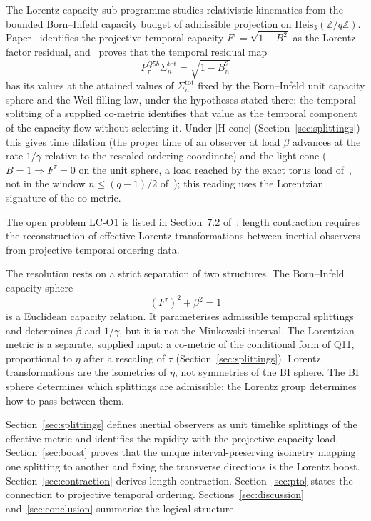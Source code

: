 \documentclass[12pt,a4paper]{article}
\theoremstyle{remark}
\theoremstyle{definition}
\begin{document}
    The Lorentz-capacity sub-programme studies relativistic kinematics from the bounded
    Born--Infeld capacity budget of admissible projection on
    $\mathrm{Heis}_3(\mathbb{Z}/q\mathbb{Z})$.
    Paper~\cite{Beau2026n} identifies the projective temporal capacity $F^\tau = \sqrt{1-B^2}$
    as the Lorentz factor residual, and~\cite{Beau2026tp} proves that the temporal residual map
    \[
      P^{Q5b}_\tau \Sigma^{\mathrm{tot}}_n = \sqrt{1-B_n^2}
    \]
    has its values at the attained values of $\Sigma^{\mathrm{tot}}_n$ fixed by the Born--Infeld unit capacity
    sphere and the Weil filling law, under the hypotheses stated there; the temporal splitting of a supplied
    co-metric identifies that value as the temporal component of the capacity flow without selecting it.
    Under [H-cone] (Section~\ref{sec:splittings}) this gives time dilation (the proper time of an observer at load
    $\beta$ advances at the rate $1/\gamma$ relative to the rescaled ordering coordinate) and the light
    cone ($B = 1 \Rightarrow F^\tau = 0$ on the unit sphere, a load reached by the exact torus load
    of~\cite{Beau2026lco3}, not in the window $n \le (q-1)/2$ of~\cite{Beau2026tp}); this reading uses the
    Lorentzian signature of the co-metric.

    The open problem LC-O1 is listed in Section~7.2 of~\cite{Beau2026tp}:
    length contraction requires the reconstruction of effective Lorentz transformations
    between inertial observers from projective temporal ordering data.

    The resolution rests on a strict separation of two structures.
    The Born--Infeld capacity sphere
    \[
      (F^\tau)^2 + \beta^2 = 1
    \]
    is a Euclidean capacity relation.
    It parameterises admissible temporal splittings and determines $\beta$ and $1/\gamma$,
    but it is not the Minkowski interval.
    The Lorentzian metric is a separate, supplied input: a co-metric of the conditional form of Q11,
    proportional to $\eta$ after a rescaling of $\tau$ (Section~\ref{sec:splittings}).
    Lorentz transformations are the isometries of $\eta$, not symmetries of the BI sphere.
    The BI sphere determines which splittings are admissible; the Lorentz group determines
    how to pass between them.

    Section~\ref{sec:splittings} defines inertial observers as unit timelike splittings of
    the effective metric and identifies the rapidity with the projective capacity load.
    Section~\ref{sec:boost} proves that the unique interval-preserving isometry mapping
    one splitting to another and fixing the transverse directions is the Lorentz boost.
    Section~\ref{sec:contraction} derives length contraction.
    Section~\ref{sec:pto} states the connection to projective temporal ordering.
    Sections~\ref{sec:discussion} and~\ref{sec:conclusion} summarise the logical structure.
\end{document}
